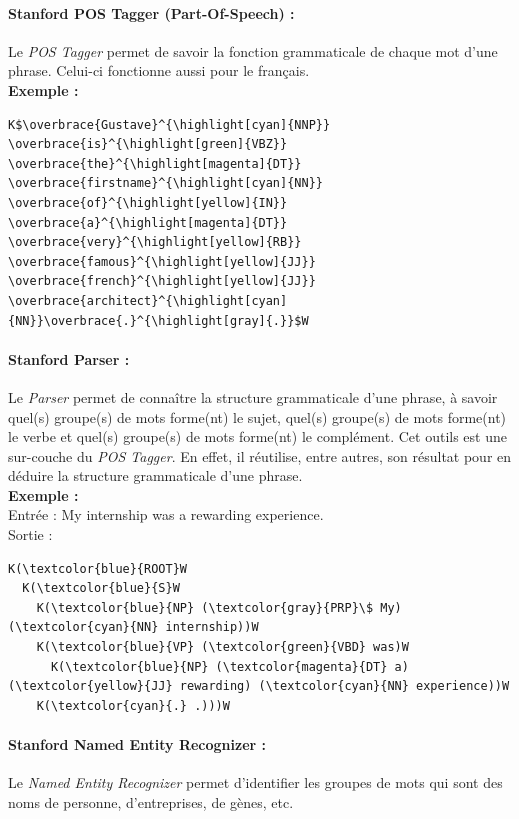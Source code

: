             \paragraph{Stanford POS Tagger (Part-Of-Speech) :}
                Le \textit{POS Tagger} permet de savoir la fonction grammaticale de chaque mot d'une phrase. Celui-ci fonctionne aussi pour le français.\\
                \textbf{Exemple :}
\begin{lstlisting}
K$\overbrace{Gustave}^{\highlight[cyan]{NNP}} \overbrace{is}^{\highlight[green]{VBZ}} \overbrace{the}^{\highlight[magenta]{DT}} \overbrace{firstname}^{\highlight[cyan]{NN}} \overbrace{of}^{\highlight[yellow]{IN}} \overbrace{a}^{\highlight[magenta]{DT}} \overbrace{very}^{\highlight[yellow]{RB}} \overbrace{famous}^{\highlight[yellow]{JJ}} \overbrace{french}^{\highlight[yellow]{JJ}} \overbrace{architect}^{\highlight[cyan]{NN}}\overbrace{.}^{\highlight[gray]{.}}$W
\end{lstlisting}
            \paragraph{Stanford Parser :}
                Le \textit{Parser} permet de connaître la structure grammaticale d'une phrase, à savoir quel(s) groupe(s) de mots forme(nt) le sujet, quel(s) groupe(s) de mots forme(nt) le verbe et quel(s) groupe(s) de mots forme(nt) le complément. Cet outils est une sur-couche du \textit{POS Tagger}. En effet, il réutilise, entre autres, son résultat pour en déduire la structure grammaticale d'une phrase.\\
                \textbf{Exemple :}\\
                Entrée : \og My internship was a rewarding experience.\fg\\
                Sortie :
\begin{lstlisting}
K(\textcolor{blue}{ROOT}W
  K(\textcolor{blue}{S}W
    K(\textcolor{blue}{NP} (\textcolor{gray}{PRP}\$ My) (\textcolor{cyan}{NN} internship))W
    K(\textcolor{blue}{VP} (\textcolor{green}{VBD} was)W
      K(\textcolor{blue}{NP} (\textcolor{magenta}{DT} a) (\textcolor{yellow}{JJ} rewarding) (\textcolor{cyan}{NN} experience))W
    K(\textcolor{cyan}{.} .)))W
\end{lstlisting}

            \paragraph{Stanford Named Entity Recognizer :}
                Le \textit{Named Entity Recognizer} permet d'identifier les groupes de mots qui sont des noms de personne, d'entreprises, de gènes, etc.

